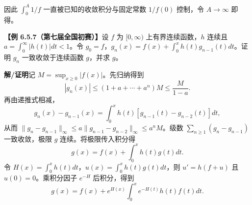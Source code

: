 \documentclass[UTF8,a4paper,11pt]{ctexart}
\newcommand{\ex}[1]{\par\noindent\textbf{【例 #1】}\;}
\newcommand{\sol}{\par\noindent\textbf{解/证明}\;}
\begin{document}
因此 $\int_0^A1/f$ 一直被已知的收敛积分与固定常数 $1/f(0)$ 控制，令 $A\to\infty$ 即得。
\ex{6.5.7（第七届全国初赛）}设 $f$ 为 $[0,\infty)$ 上有界连续函数，$h$ 连续且 $a=\int_0^\infty|h(t)|dt<1$。令 $g_0=f$，$g_n(x)=f(x)+\int_0^xh(t)g_{n-1}(t)dt$。证明 $g_n$ 一致收敛于连续函数 $g$，并求 $g$。
\sol 记 $M=\sup_{x\ge0}|f(x)|$。先归纳得到
\[|g_n(x)|\le(1+a+\cdots+a^n)M\le\frac M{1-a}.\]
再由递推式相减，
\[g_n(x)-g_{n-1}(x)=\int_0^xh(t)[g_{n-1}(t)-g_{n-2}(t)]dt,\]
从而 $\|g_n-g_{n-1}\|_\infty\le a\|g_{n-1}-g_{n-2}\|_\infty\le a^nM$。级数 $\sum_{n\ge1}(g_n-g_{n-1})$ 一致收敛，极限 $g$ 连续。将极限传入积分得
\[g(x)=f(x)+\int_0^xh(t)g(t)dt.\]
令 $H(x)=\int_0^xh(t)dt$，$u(x)=\int_0^xh(t)g(t)dt$，则 $u'=h(f+u)$ 且 $u(0)=0$。乘积分因子 $e^{-H}$ 后积分，得到
\[\boxed{\displaystyle g(x)=f(x)+e^{H(x)}\int_0^xe^{-H(t)}h(t)f(t)dt.}\]
\end{document}

